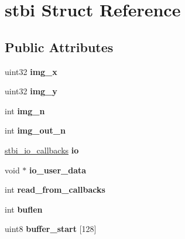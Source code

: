 \hypertarget{structstbi}{\section{stbi Struct Reference}
\label{structstbi}
}
\subsection*{Public Attributes}
\begin{DoxyCompactItemize}
\item 
\hypertarget{structstbi_af3b42c257fb0d8896f29ca3921540a42}{uint32 {\bfseries img\+\_\+x}}\label{structstbi_af3b42c257fb0d8896f29ca3921540a42}

\item 
\hypertarget{structstbi_a60cb5a630e268b2d12306c6eca246dd1}{uint32 {\bfseries img\+\_\+y}}\label{structstbi_a60cb5a630e268b2d12306c6eca246dd1}

\item 
\hypertarget{structstbi_ae22cfcc23f5ab67bede22942333ecbd7}{int {\bfseries img\+\_\+n}}\label{structstbi_ae22cfcc23f5ab67bede22942333ecbd7}

\item 
\hypertarget{structstbi_a33f6519d8f99b84afbde795dc7a931f2}{int {\bfseries img\+\_\+out\+\_\+n}}\label{structstbi_a33f6519d8f99b84afbde795dc7a931f2}

\item 
\hypertarget{structstbi_a86596e1eb2b0f57a60a18777bd37ff53}{\hyperlink{structstbi__io__callbacks}{stbi\+\_\+io\+\_\+callbacks} {\bfseries io}}\label{structstbi_a86596e1eb2b0f57a60a18777bd37ff53}

\item 
\hypertarget{structstbi_a9838a0c89630f283c25a16f4e30f40aa}{void $\ast$ {\bfseries io\+\_\+user\+\_\+data}}\label{structstbi_a9838a0c89630f283c25a16f4e30f40aa}

\item 
\hypertarget{structstbi_acb201cc1b3eb134f342cee89f5d11e70}{int {\bfseries read\+\_\+from\+\_\+callbacks}}\label{structstbi_acb201cc1b3eb134f342cee89f5d11e70}

\item 
\hypertarget{structstbi_a76d6f761529ecff7f02469b19371af0e}{int {\bfseries buflen}}\label{structstbi_a76d6f761529ecff7f02469b19371af0e}

\item 
\hypertarget{structstbi_af99edda496281a6ca1b58271cabdbc69}{uint8 {\bfseries buffer\+\_\+start} \mbox{[}128\mbox{]}}\label{structstbi_af99edda496281a6ca1b58271cabdbc69}


\end{DoxyCompactItemize}
